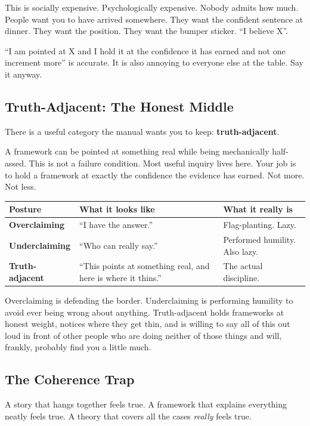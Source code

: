 \documentclass[11pt, letterpaper]{article}
\newcommand{\vocab}[1]{\textbf{\textcolor{meatred}{#1}}}
\begin{document}
This is socially expensive. Psychologically expensive. Nobody admits how much. People want you to have arrived somewhere. They want the confident sentence at dinner. They want the position. They want the bumper sticker. ``I believe X''.

``I am pointed at X and I hold it at the confidence it has earned and not one increment more'' is accurate. It is also annoying to everyone else at the table. Say it anyway.

\subsection{Truth-Adjacent: The Honest Middle}

There is a useful category the manual wants you to keep: \vocab{truth-adjacent}.

A framework can be pointed at something real while being mechanically half-assed. This is not a failure condition. Most useful inquiry lives here. Your job is to hold a framework at exactly the confidence the evidence has earned. Not more. Not less.

\begin{center}
\small
\begin{tabular}{@{} >{\bfseries}l l l @{}}
\toprule
\textbf{Posture} & \textbf{What it looks like} & \textbf{What it really is} \\
\midrule
Overclaiming & ``I have the answer.'' & Flag-planting. Lazy. \\
Underclaiming & ``Who can really say.'' & Performed humility. Also lazy. \\
Truth-adjacent & ``This points at something real, and here is where it thins.'' & The actual discipline. \\
\bottomrule
\end{tabular}
\end{center}

Overclaiming is defending the border. Underclaiming is performing humility to avoid ever being wrong about anything. Truth-adjacent holds frameworks at honest weight, notices where they get thin, and is willing to say all of this out loud in front of other people who are doing neither of those things and will, frankly, probably find you a little much.

\subsection{The Coherence Trap}

A story that hangs together feels true. A framework that explains everything neatly feels true. A theory that covers all the cases \textit{really} feels true.
\end{document}

